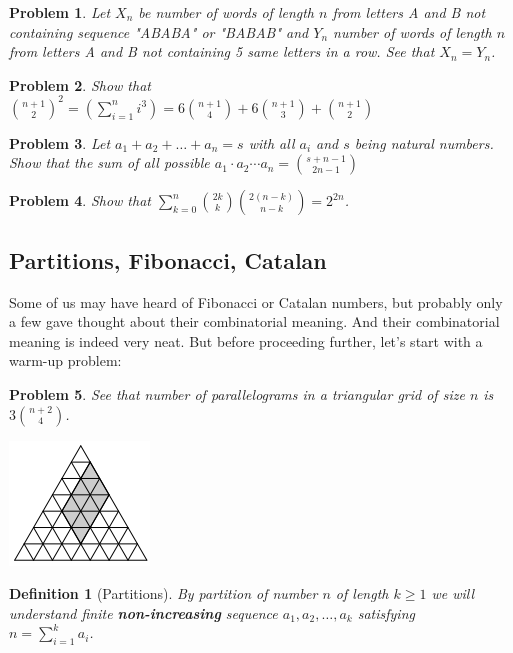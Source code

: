 \documentclass[11pt,a5paper]{article}
\newtheorem{definition}{Definition}
\newtheorem{problem}{Problem}
\begin{document}
\begin{problem}
Let $X_n$ be number of words of length $n$ from letters A and B not containing sequence "ABABA" or "BABAB" and $Y_n$ number of words of length $n$ from letters A and B not containing 5 same letters in a row. See that $X_n = Y_n$.
\end{problem}

\begin{problem}
Show that ${n+1 \choose 2}^2 = (\sum_{i=1}^n i^3) = 6{n+1 \choose 4} + 6{n+1 \choose 3} + {n+1 \choose 2}$
\end{problem}

\begin{problem}
Let $a_1 + a_2 + \dots + a_n = s$ with all $a_i$ and $s$ being natural numbers. Show that the sum of all possible $a_1 \cdot a_2 \cdots a_n = {s + n - 1 \choose 2n - 1}$
\end{problem}

\begin{problem}
Show that $\sum_{k=0}^n {2k \choose k}{2(n-k)\choose n-k} = 2^{2n}$.
\end{problem}

\break
\subsection*{Partitions, Fibonacci, Catalan}

Some of us may have heard of Fibonacci or Catalan numbers, but probably only a few gave thought about their combinatorial meaning. And their combinatorial meaning is indeed very neat. But before proceeding further, let's start with a warm-up problem:

\begin{problem}
See that number of parallelograms in a triangular grid of size $n$ is $3{n + 2 \choose 4}$.
\end{problem}
\centerline{\includegraphics[scale=0.8]{triangle}}

\begin{definition}[Partitions]
By partition of number $n$ of length $k \ge 1$ we will understand finite \textbf{non-increasing} sequence $a_1, a_2, \dots, a_k$ satisfying \\ $n = \sum^k_{i=1} a_i$.
\end{definition}
\end{document}

